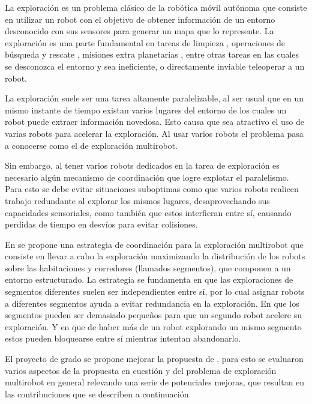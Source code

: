 La exploración es un problema clásico de la robótica móvil autónoma que
consiste en utilizar un robot con el objetivo de obtener información de un
entorno desconocido con sus sensores para generar un mapa que lo represente. La
exploración es una parte fundamental en tareas de limpieza \cite{luo2002real},
operaciones de búsqueda y rescate \cite{Liu2015}, misiones extra planetarias
\cite{schuster2019towards}, entre otras tareas en las cuales se desconozca el
entorno y sea ineficiente, o directamente inviable teleoperar a un robot.

La exploración suele ser una tarea altamente paralelizable, al ser usual que en
un mismo instante de tiempo existan varios lugares del entorno de los cuales un
robot puede extraer información novedosa. Esto causa que sea atractivo el uso
de varias robots para acelerar la exploración. Al usar varios robots el
problema pasa a conocerse como el de exploración multirobot.

Sin embargo, al tener varios robots dedicados en la tarea de exploración es
necesario algún mecanismo de coordinación que logre explotar el paralelismo.
Para esto se debe evitar situaciones suboptimas como que varios robots realicen
trabajo redundante al explorar los mismos lugares, desaprovechando sus
capacidades sensoriales, como también que estos interfieran entre sí, causando
perdidas de tiempo en desvíos para evitar colisiones.

En \cite{wurm2008coordinated} se propone una estrategia de coordinación para la
exploración multirobot que consiste en llevar a cabo la exploración maximizando
la distribución de los robots sobre las habitaciones y corredores (llamados
segmentos), que componen a un entorno estructurado. La estrategia se fundamenta
en que las exploraciones de segmentos diferentes suelen ser independientes
entre sí, por lo cual asignar robots a diferentes segmentos ayuda a evitar
redundancia en la exploración. En que los segmentos pueden ser demasiado
pequeños para que un segundo robot acelere su exploración. Y en que de haber
más de un robot explorando un mismo segmento estos pueden bloquearse entre sí
mientras intentan abandonarlo.


El proyecto de grado se propone mejorar la propuesta de
\cite{wurm2008coordinated}, para esto se evaluaron varios aspectos de la
propuesta en cuestión y del problema de exploración multirobot en general
relevando una serie de potenciales mejoras, que resultan en las contribuciones
que se describen a continuación.

